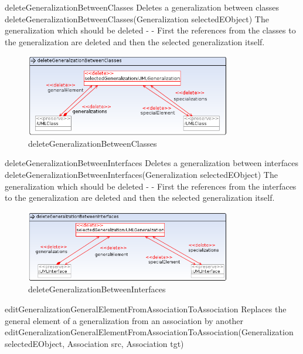 \op
{deleteGeneralizationBetweenClasses}
{Deletes a generalization between classes}
{deleteGeneralizationBetweenClasses(Generalization selectedEObject)}
{The generalization which should be deleted}
{-}
{-}
{First the references from the classes to the generalization are deleted
and then the selected generalization itself.}
\begin{figure}[H]
  \centering
  \includegraphics[width=0.8\textwidth]{pics/deleteGeneralizationBetweenClasses.png}
  \caption{deleteGeneralizationBetweenClasses}
  \label{deleteGeneralizationBetweenClasses}
\end{figure}
\op
{deleteGeneralizationBetweenInterfaces}
{Deletes a generalization between interfaces}
{deleteGeneralizationBetweenInterfaces(Generalization selectedEObject)}
{The generalization which should be deleted}
{-}
{-}
{First the references from the interfaces to the generalization are deleted
and then the selected generalization itself.}
\begin{figure}[H]
  \centering
  \includegraphics[width=0.8\textwidth]{pics/deleteGeneralizationBetweenInterfaces.png}
  \caption{deleteGeneralizationBetweenInterfaces}
  \label{deleteGeneralizationBetweenInterfaces}
\end{figure}
\op
{editGeneralizationGeneralElementFromAssociationToAssociation}
{Replaces the general element of a generalization from an association by
another}
{editGeneralizationGeneralElementFromAssociationToAssociation(Generalization
selectedEObject, Association src, Association tgt)}
